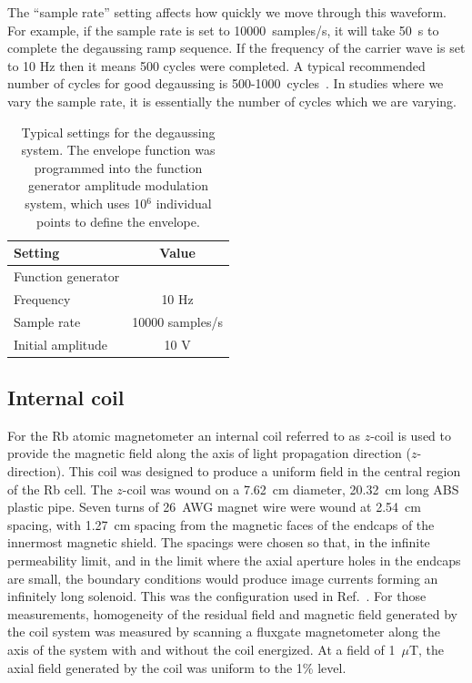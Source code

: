 The ``sample rate'' setting affects how quickly we move through this
waveform.  For example, if the sample rate is set to 10000~samples/s,
it will take 50~s to complete the degaussing ramp sequence.  If the
frequency of the carrier wave is set to 10 Hz then it means 500 cycles
were completed.  A typical recommended number of cycles for good
degaussing is 500-1000~cycles~\cite{bib:thiel}.  In studies where we
vary the sample rate, it is essentially the number of cycles which we
are varying.
\begin{table}%
\centering
\begin{tabular}{|l|c|}\hline
\textbf{Setting}    & \textbf{Value} \\\hline
Function generator &   \\\hline
Frequency &  10 Hz   \\
Sample rate    &  10000 samples/s  \\
Initial amplitude   &   10 V \\
\hline
\end{tabular}
\caption{Typical settings for the degaussing system.  The envelope
  function was programmed into the function generator amplitude
  modulation system, which uses 10$^6$ individual points to define the
  envelope.\label{table:degaussing-setting}}
\end{table}


\subsection{Internal coil\label{sec:internal-coil}}

For the Rb atomic magnetometer an internal coil referred to as
$z$-coil is used to provide the magnetic field along the axis of light
propagation direction ($z$-direction). This coil was designed to
produce a uniform field in the central region of the Rb cell. The
$z$-coil was wound on a 7.62~cm diameter, 20.32~cm long ABS plastic
pipe. Seven turns of 26~AWG magnet wire were wound at 2.54~cm spacing,
with 1.27~cm spacing from the magnetic faces of the endcaps of the
innermost magnetic shield.  The spacings were chosen so that, in the
infinite permeability limit, and in the limit where the axial aperture
holes in the endcaps are small, the boundary conditions would produce
image currents forming an infinitely long solenoid.  This was the
configuration used in Ref.~\cite{bib:nmor-shielding}.  For those
measurements, homogeneity of the residual field and magnetic field
generated by the coil system was measured by scanning a fluxgate
magnetometer along the axis of the system with and without the coil
energized. At a field of 1~$\mu$T, the axial field generated by the
coil was uniform to the 1\% level.

